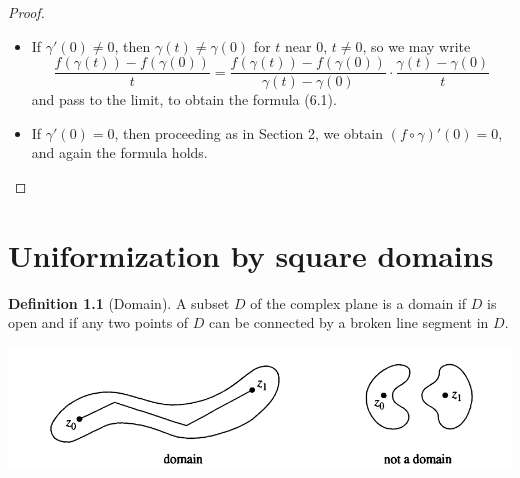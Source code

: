 \documentclass[
]{book}
\providecommand{\tightlist}{%
  \setlength{\itemsep}{0pt}\setlength{\parskip}{0pt}}
\theoremstyle{definition}
\newtheorem{definition}{Definition}[chapter]
\theoremstyle{definition}
\theoremstyle{definition}
\theoremstyle{definition}
\theoremstyle{remark}
\begin{document}
\begin{proof}
\leavevmode

\begin{itemize}
\tightlist
\item
  If \(\gamma'(0) \neq 0\), then \(\gamma(t) \neq \gamma(0)\) for \(t\) near \(0\), \(t \neq 0\), so we may write
  \begin{equation}
  \frac{f(\gamma(t)) - f(\gamma(0))}{t} = \frac{f(\gamma(t)) - f(\gamma(0))}{\gamma(t) - \gamma(0)} \cdot \frac{\gamma(t) - \gamma(0)}{t}
  \end{equation}
  and pass to the limit, to obtain the formula (6.1).
\item
  If \(\gamma'(0) = 0\), then proceeding as in Section 2, we obtain \((f \circ \gamma)'(0) = 0\), and again the formula holds.
\end{itemize}

\end{proof}

\chapter{Uniformization by square domains}\label{uniformization-by-square-domains}

\begin{definition}[Domain]
\protect\hypertarget{def:unnamed-chunk-25}{}\label{def:unnamed-chunk-25}A subset \(D\) of the complex plane is a domain if \(D\) is open and if any two points of \(D\) can be connected by a broken line segment in \(D\).
\end{definition}

\includegraphics[width=12.58in]{figures/Mario_Bonk/fig1}
\end{document}
